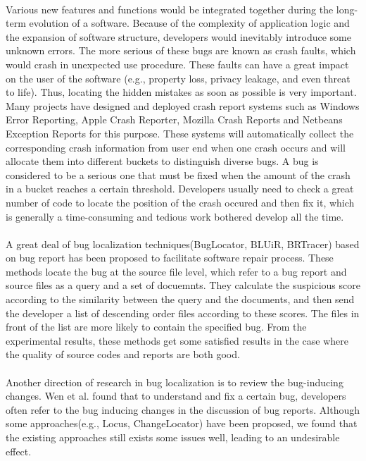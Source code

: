\documentclass[a4paper]{article}
\begin{document}
\paragraph{}
Various new features and functions would be integrated together during the long-term evolution of a software. Because of the complexity of application logic and the expansion of software structure, developers would inevitably introduce some unknown errors. The more serious of these bugs are known as crash faults, which would crash in unexpected use procedure. These faults can have a great impact on the user of the software (e.g., property loss, privacy leakage, and even threat to life). Thus, locating the hidden mistakes as soon as possible is very important. Many projects have designed and deployed crash report systems such as Windows Error Reporting\cite{WindowsErrorReport}, Apple Crash Reporter, Mozilla Crash Reports and Netbeans Exception Reports for this purpose. These systems will automatically collect the corresponding crash information from user end when one crash occurs and will allocate them into different buckets to distinguish diverse bugs. A bug is considered to be a serious one that must be fixed when the amount of the crash in a bucket reaches a certain threshold. Developers usually need to check a great number of code to locate the position of the crash occured and then fix it, which is generally a time-consuming and tedious work bothered develop all the time.
\vspace{-1em}

\paragraph{}
A great deal of bug localization techniques(BugLocator\cite{BugLocator}, BLUiR\cite{BLUiR}, BRTracer\cite{BRTracer}) based on bug report has been proposed to facilitate software repair process. These methods locate the bug at the source file level, which refer to a bug report and source files as a query and a set of docuemnts. They calculate the suspicious score according to the similarity between the query and the documents, and then send the developer a list of descending order files according to these scores. The files in front of the list are more likely to contain the specified bug. From the experimental results, these methods get some satisfied results in the case where the quality of source codes and reports are both good.
\vspace{-1em}

\paragraph{}
Another direction of research in bug localization is to review the bug-inducing changes. Wen et al.\cite{Locus} found that to understand and fix a certain bug, developers often refer to the bug inducing changes in the discussion of bug reports. Although some approaches(e.g., Locus\cite{Locus}, ChangeLocator\cite{ChangeLocator}) have been proposed, we found that the existing approaches still exists some issues well, leading to an undesirable effect.
\vspace{-1em}
\end{document}
